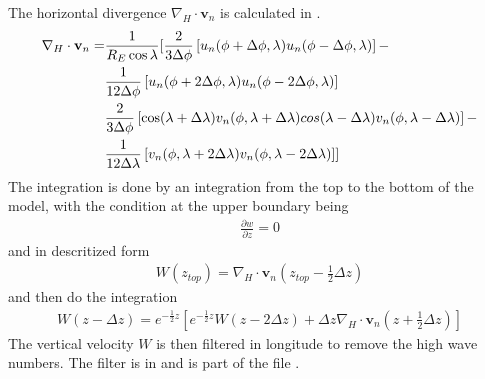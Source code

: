 The horizontal divergence $\nabla_H \cdot \mathbf{v}_n $ is
calculated in .
%
\begin{align}
  \nabla_H \cdot \mathbf{v}_n = & \frac{1}{R_E \cos \lambda} [ \frac{2}{3 \Delta \phi}\left[ u_n(\phi+ \Delta \phi,\lambda)
    u_n(\phi- \Delta \phi,\lambda)\right] - \notag \\
    {}&  \frac{1}{12 \Delta \phi}\left[ u_n(\phi+ 2\Delta \phi,\lambda)
    u_n(\phi- 2\Delta \phi,\lambda)\right] \notag \\
  {} & \frac{2}{3 \Delta \phi}\left[ \cos (\lambda + \Delta \lambda) v_n(\phi,\lambda + \Delta \lambda)
    cos (\lambda - \Delta \lambda) v_n(\phi,\lambda - \Delta \lambda)\right]
    - \notag \\
   {} & \frac{1}{12 \Delta \lambda}\left[ v_n(\phi,\lambda+2\Delta \lambda)
    v_n(\phi,\lambda-2 \Delta \lambda)\right]]
\end{align}
%
The integration is done by an integration from the top to the bottom of
the model, with the condition at the upper boundary being
%
\begin{align}
  \frac{\partial w}{\partial z} = 0
\end{align}
%
and in descritized form
%
\begin{align}
  W(z_{top}) = \nabla_H \cdot \mathbf{v}_n(z_{top}-\frac{1}{2} \Delta z)
\end{align}
%
and then do the integration
%
\begin{align}
  W(z - \Delta z) = e^{-\frac{1}{2}z}\left[e^{-\frac{1}{2}z}W(z - 2\Delta z)+ \Delta z
  \nabla_H \cdot \mathbf{v}_n(z+\frac{1}{2} \Delta
  z)\right]
\end{align}
%
The vertical velocity $W$ is then filtered in longitude to remove
the high wave numbers. The filter is in 
and is part of the file .
